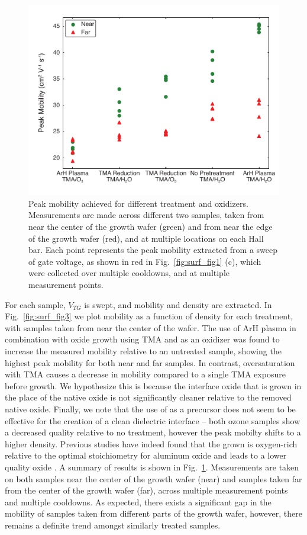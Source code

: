 \begin{figure}
\includegraphics[width=0.6\linewidth]{Figure4}
\caption[Peak mobilities for different treatments and oxidizers]{\label{fig:surf_fig4} Peak mobility achieved for different treatment and oxidizers. Measurements are made across different two samples, taken from near the center of the growth wafer (green) and from near the edge of the growth wafer (red), and at multiple locations on each Hall bar. Each point represents the peak mobility extracted from a sweep of gate voltage, as shown in red in Fig.~\ref{fig:surf_fig1} (c), which were collected over multiple cooldowns, and at multiple measurement points.}
\end{figure}

For each sample, $V_{TG}$ is swept, and mobility and density are extracted. In Fig.~\ref{fig:surf_fig3} we plot mobility as a function of density for each treatment, with samples taken from near the center of the wafer. The use of ArH plasma in combination with oxide growth using TMA and  as an oxidizer was found to increase the measured mobility relative to an untreated sample, showing the highest peak mobility for both near and far samples. In contrast, oversaturation with TMA causes a decrease in mobility compared to a single TMA exposure before  growth. We hypothesize this is because the interface oxide that is grown in the place of the native oxide is not significantly cleaner relative to the removed native oxide.  Finally, we note that the use of  as a precursor does not seem to be effective for the creation of a clean dielectric interface -- both ozone samples show a decreased quality relative to no treatment, however the peak mobilty shifts to a higher density. Previous studies have indeed found that the  grown is oxygen-rich relative to the optimal stoichiometry for aluminum oxide and leads to a lower quality oxide \cite{ingaas_redux,10.1021/cm0608903}.  A summary of results is shown in Fig.~\ref{fig:surf_fig4}. Measurements are taken on both samples near the center of the growth wafer (near) and samples taken far from the center of the growth wafer (far), across multiple measurement points and multiple cooldowns. As expected, there exists a significant gap in the mobility of samples taken from different parts of the growth wafer, however, there remains a definite trend amongst similarly treated samples.

